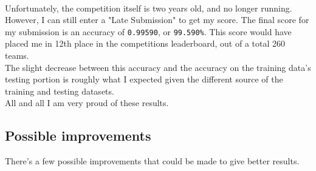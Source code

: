 \documentclass[a4paper, 9pt]{extarticle}
\newcommand{\code}{\texttt}
\begin{document}
\\
Unfortunately, the competition itself is two years old, and no longer running. However, I can still enter a "Late Submission" to get my score. The final score for my submission is an accuracy of \code{0.99590}, or \code{99.590\%}. This score would have placed me in 12th place in the competitions leaderboard, out of a total 260 teams.\\
The slight decrease between this accuracy and the accuracy on the training data's testing portion is roughly what I expected given the different source of the training and testing datasets.\\
All and all I am very proud of these results.

\subsection{Possible improvements}
There's a few possible improvements that could be made to give better results.
\end{document}
